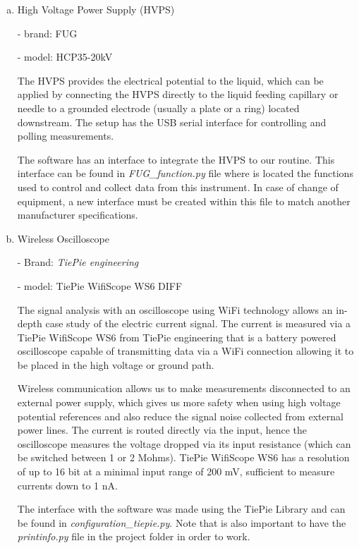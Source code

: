 \begin{enumerate}[a)]

  \item High Voltage Power Supply (HVPS)
  
     - brand: FUG
    
     - model: HCP35-20kV
    
    The HVPS provides the electrical potential to the liquid, which can be applied by connecting the HVPS directly to the liquid feeding capillary or needle to a grounded electrode (usually a plate or a ring) located downstream.\cite{Monica}
    The setup has the USB serial interface for controlling and polling measurements.
    
    The software has an interface to integrate the HVPS to our routine. This interface can be found in \emph{FUG\_function.py} file where is located the functions used to control and collect data from this instrument.
    In case of change of equipment, a new interface must be created within this file to match another manufacturer specifications.

  \item Wireless Oscilloscope
  
     - Brand: \emph{TiePie engineering}

     - model: TiePie WifiScope WS6 DIFF
    
    The signal analysis with an oscilloscope using WiFi technology allows an in-depth case study of the electric current signal.
    The current is measured via a TiePie WifiScope WS6 from TiePie engineering that is a battery powered oscilloscope capable of transmitting data via a WiFi connection allowing it to be placed in the high voltage or ground path.
    
    Wireless communication allows us to make measurements disconnected to an external power supply, which gives us more safety when using high voltage potential references and also reduce the signal noise collected from external power lines.
    The current is routed directly via the input, hence the oscilloscope measures the voltage dropped via its input resistance (which can be switched between 1 or 2 Mohms).
    TiePie WifiScope WS6 has a resolution of up to 16 bit at a minimal input range of 200 mV, sufficient to measure currents down to 1 nA.

    The interface with the software was made using the TiePie Library\cite{TiePieLib} and can be found in \emph{configuration\_tiepie.py}. Note that is also important to have the \emph{printinfo.py} file in the project folder in order to work.


\end{enumerate}
